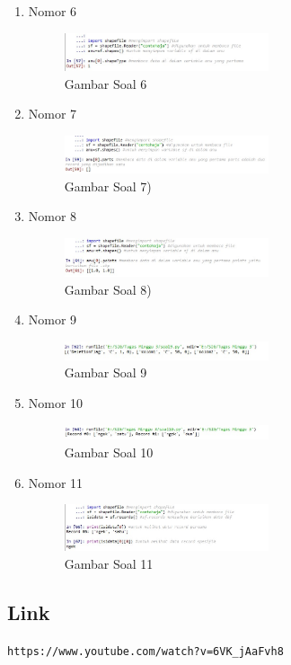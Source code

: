 \begin{enumerate}
	\item Nomor 6
	
	\begin{figure}[H]
		\includegraphics[width=6cm]{figures/Tugas3/1174087/soal6.jpg}
		\centering
		\caption{Gambar Soal 6}
	\end{figure}
	\item Nomor 7
	
	\begin{figure}[H]
		\includegraphics[width=6cm]{figures/Tugas3/1174087/soal7.jpg}
		\centering
		\caption{Gambar Soal 7)}
	\end{figure}
	\item Nomor 8
	
	\begin{figure}[H]
		\includegraphics[width=6cm]{figures/Tugas3/1174087/soal8.jpg}
		\centering
		\caption{Gambar Soal 8)}
	\end{figure}
	\item Nomor 9
	
	\begin{figure}[H]
		\includegraphics[width=6cm]{figures/Tugas3/1174087/soal9.jpg}
		\centering
		\caption{Gambar Soal 9}
	\end{figure}
	\item Nomor 10
	
	\begin{figure}[H]
		\includegraphics[width=6cm]{figures/Tugas3/1174087/soal10.jpg}
		\centering
		\caption{Gambar Soal 10 }
	\end{figure}
	\item Nomor 11
	
	\begin{figure}[H]
		\includegraphics[width=6cm]{figures/Tugas3/1174087/soal11.jpg}
		\centering
		\caption{Gambar Soal 11 }
	\end{figure}
\end{enumerate}
\subsection{Link}
\verb|https://www.youtube.com/watch?v=6VK_jAaFvh8|